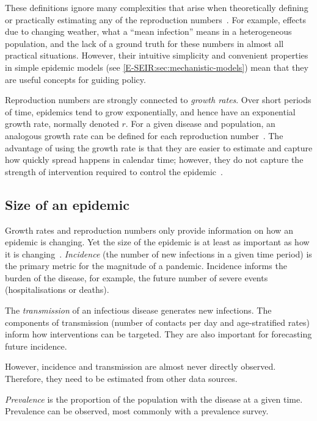 \documentclass[thesis.tex]{subfiles}
\begin{document}
These definitions ignore many complexities that arise when theoretically defining or practically estimating any of the reproduction numbers~\autocite{pellisEstimation}.
For example, effects due to changing weather, what a ``mean infection'' means in a heterogeneous population, and the lack of a ground truth for these numbers in almost all practical situations.
However, their intuitive simplicity and convenient properties in simple epidemic models (see \cref{E-SEIR:sec:mechanistic-models}) mean that they are useful concepts for guiding policy.

Reproduction numbers are strongly connected to \emph{growth rates}.
Over short periods of time, epidemics tend to grow exponentially, and hence have an exponential growth rate, normally denoted $r$.
For a given disease and population, an analogous growth rate can be defined for each reproduction number~\autocite{pellisEstimation,paragGrowthRates,wallingaGI}.
The advantage of using the growth rate is that they are easier to estimate and capture how quickly spread happens in calendar time; however, they do not capture the strength of intervention required to control the epidemic~\autocite{royalSocietyRnumber}.

\subsection{Size of an epidemic}

Growth rates and reproduction numbers only provide information on how an epidemic is changing.
Yet the size of the epidemic is at least as important as how it is changing~\autocite{pellisEstimation}.
\emph{Incidence} (the number of new infections in a given time period) is the primary metric for the magnitude of a pandemic.
Incidence informs the burden of the disease, for example, the future number of severe events (hospitalisations or deaths).

The \emph{transmission} of an infectious disease generates new infections.
The components of transmission (\eg number of contacts per day and age-stratified rates) inform how interventions can be targeted.
They are also important for forecasting future incidence.

However, incidence and transmission are almost never directly observed.
Therefore, they need to be estimated from other data sources.

\emph{Prevalence} is the proportion of the population with the disease at a given time.
Prevalence can be observed, most commonly with a prevalence survey.
\end{document}
